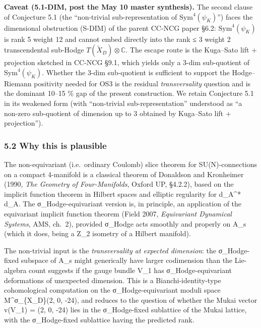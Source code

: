 \documentclass[
 11pt,
 a4paper,
]{article}
\begin{document}
\textbf{Caveat (5.1-DIM, post the May 10 master synthesis).} The second clause of Conjecture 5.1 (the ``non-trivial sub-representation of \(\mathrm{Sym}^4(\psi_K)\)'') faces the dimensional obstruction (S-DIM) of the parent CC-NCG paper §6.2: \(\mathrm{Sym}^4(\psi_K)\) is rank 5 weight 12 and cannot embed directly into the rank ≤ 3 weight 2 transcendental sub-Hodge \(T(\widetilde{X}_D) \otimes \mathbb{C}\). The escape route is the Kuga--Sato lift + projection sketched in CC-NCG §9.1, which yields only a 3-dim sub-quotient of \(\mathrm{Sym}^4(\psi_K)\). Whether the 3-dim sub-quotient is sufficient to support the Hodge--Riemann positivity needed for OS3 is the residual \emph{transversality} question and is the dominant 10--15 \% gap of the present construction. We retain Conjecture 5.1 in its weakened form (with ``non-trivial sub-representation'' understood as ``a non-zero sub-quotient of dimension up to 3 obtained by Kuga--Sato lift + projection'').

\hypertarget{why-this-is-plausible}{%
\subsubsection{5.2 Why this is plausible}\label{why-this-is-plausible}}

The non-equivariant (i.e.~ordinary Coulomb) slice theorem for SU(N)-connections on a compact 4-manifold is a classical theorem of Donaldson and Kronheimer (1990, \emph{The Geometry of Four-Manifolds}, Oxford UP, §4.2.2), based on the implicit function theorem in Hilbert spaces and elliptic regularity for d\_A\^{}* d\_A. The σ\_Hodge-equivariant version is, in principle, an application of the equivariant implicit function theorem (Field 2007, \emph{Equivariant Dynamical Systems}, AMS, ch.~2), provided σ\_Hodge acts smoothly and properly on A\_s (which it does, being a Z\_2 isometry of a Hilbert manifold).

The non-trivial input is the \emph{transversality at expected dimension}: the σ\_Hodge-fixed subspace of A\_s might generically have larger codimension than the Lie-algebra count suggests if the gauge bundle V\_1 has σ\_Hodge-equivariant deformations of unexpected dimension. This is a Bianchi-identity-type cohomological computation on the σ\_Hodge-equivariant moduli space M\^{}σ\_\{X\_D\}(2, 0, -24), and reduces to the question of whether the Mukai vector v(V\_1) = (2, 0, -24) lies in the σ\_Hodge-fixed sublattice of the Mukai lattice, with the σ\_Hodge-fixed sublattice having the predicted rank.
\end{document}
